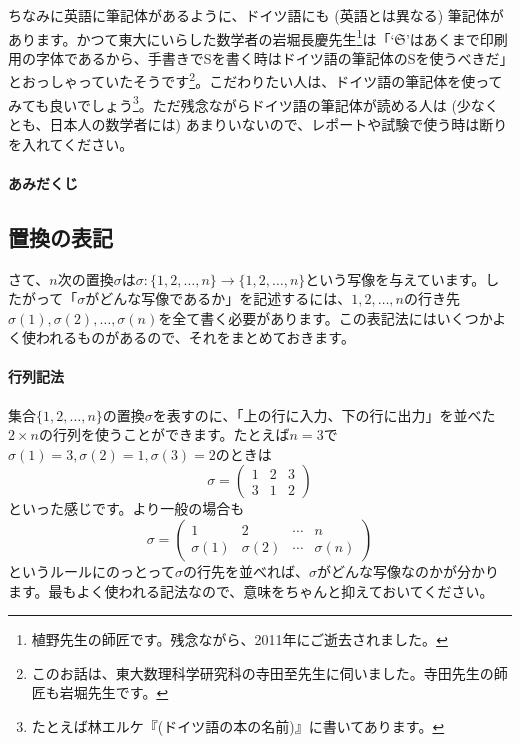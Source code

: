 ちなみに英語に筆記体があるように、ドイツ語にも (英語とは異なる) 筆記体があります。かつて東大にいらした数学者の岩堀長慶先生\footnote{植野先生の師匠です。残念ながら、2011年にご逝去されました。}は「`$\mathfrak{S}$'はあくまで印刷用の字体であるから、手書きでSを書く時はドイツ語の筆記体のSを使うべきだ」とおっしゃっていたそうです\footnote{このお話は、東大数理科学研究科の寺田至先生に伺いました。寺田先生の師匠も岩堀先生です。}。こだわりたい人は、ドイツ語の筆記体を使ってみても良いでしょう\footnote{たとえば林エルケ『(ドイツ語の本の名前)』に書いてあります。}。ただ残念ながらドイツ語の筆記体が読める人は (少なくとも、日本人の数学者には) あまりいないので、レポートや試験で使う時は断りを入れてください。

\paragraph{あみだくじ}

\subsection{置換の表記}

さて、$n$次の置換$\sigma$は$\sigma\colon \{1, 2, \ldots, n\} \rightarrow \{1, 2, \ldots, n\}$という写像を与えています。したがって「$\sigma$がどんな写像であるか」を記述するには、$1, 2, \ldots, n$の行き先$\sigma(1), \sigma(2), \ldots, \sigma(n)$を全て書く必要があります。この表記法にはいくつかよく使われるものがあるので、それをまとめておきます。

\paragraph{行列記法}

集合$\{1, 2, \ldots, n\}$の置換$\sigma$を表すのに、「上の行に入力、下の行に出力」を並べた$2\times n$の行列を使うことができます。たとえば$n = 3$で$\sigma(1) = 3, \sigma(2) = 1, \sigma(3) = 2$のときは
\[
\sigma =
\begin{pmatrix}
1 & 2 & 3 \\
3 & 1 & 2
\end{pmatrix}
\]
といった感じです。より一般の場合も
\[
\sigma =
\begin{pmatrix}
1 & 2 & \cdots & n \\
\sigma(1) & \sigma(2) & \cdots & \sigma(n)
\end{pmatrix}
\]
というルールにのっとって$\sigma$の行先を並べれば、$\sigma$がどんな写像なのかが分かります。最もよく使われる記法なので、意味をちゃんと抑えておいてください。

